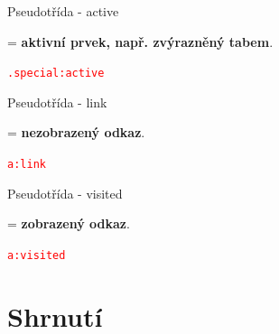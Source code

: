 \documentclass[aspectratio=1610]{beamer}
\begin{document}
\begin{frame}{Pseudotřída - active}
    \begin{cardTiny}
        \begin{flushleft}
            = \textbf{aktivní prvek, např. zvýrazněný tabem}.

            \begin{alltt}
                \textcolor{red}{.special:active} \string{\\
                    \textcolor{gray}{/* styly */}\\
                \string}
            \end{alltt}
        \end{flushleft}
    \end{cardTiny}
\end{frame}

\begin{frame}{Pseudotřída - link}
    \begin{cardTiny}
        \begin{flushleft}
            = \textbf{nezobrazený odkaz}.

            \begin{alltt}
                \textcolor{red}{a:link} \string{\\
                    \textcolor{gray}{/* styly */}\\
                \string}
            \end{alltt}
        \end{flushleft}
    \end{cardTiny}
\end{frame}

\begin{frame}{Pseudotřída - visited}
    \begin{cardTiny}
        \begin{flushleft}
            = \textbf{zobrazený odkaz}.

            \begin{alltt}
                \textcolor{red}{a:visited} \string{\\
                    \textcolor{gray}{/* styly */}\\
                \string}
            \end{alltt}
        \end{flushleft}
    \end{cardTiny}
\end{frame}

\section{Shrnutí}
\end{document}
